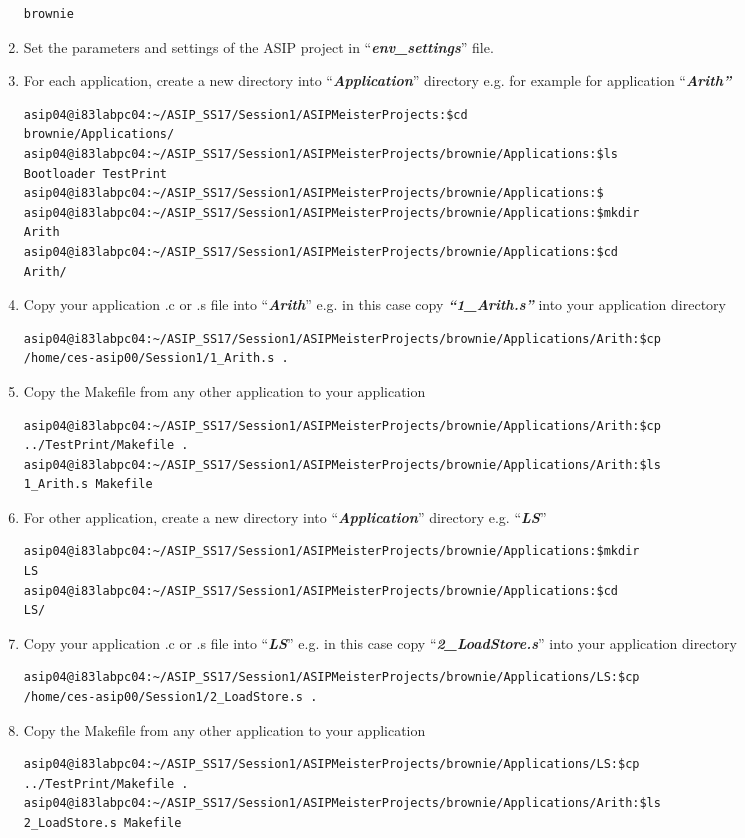 \begin{enumerate}
\begin{lstlisting}
brownie
\end{lstlisting}
	\item Set the parameters and settings of the ASIP project in 
	``\emph{\textbf{env\_settings}}'' file.
	\item For each application, create a new directory into
	``\emph{\textbf{Application}}'' directory e.g. for example for application ``\emph{\textbf{Arith''}}
\begin{lstlisting}
asip04@i83labpc04:~/ASIP_SS17/Session1/ASIPMeisterProjects:$cd
brownie/Applications/
asip04@i83labpc04:~/ASIP_SS17/Session1/ASIPMeisterProjects/brownie/Applications:$ls
Bootloader TestPrint
asip04@i83labpc04:~/ASIP_SS17/Session1/ASIPMeisterProjects/brownie/Applications:$
asip04@i83labpc04:~/ASIP_SS17/Session1/ASIPMeisterProjects/brownie/Applications:$mkdir
Arith
asip04@i83labpc04:~/ASIP_SS17/Session1/ASIPMeisterProjects/brownie/Applications:$cd
Arith/
\end{lstlisting}
	\item Copy your application .c or .s file into ``\emph{\textbf{Arith}}''
	e.g. in this case copy \emph{\textbf{``1\_Arith.s''}} into your
	application directory
\begin{lstlisting}
asip04@i83labpc04:~/ASIP_SS17/Session1/ASIPMeisterProjects/brownie/Applications/Arith:$cp
/home/ces-asip00/Session1/1_Arith.s .
\end{lstlisting}
	\item Copy the Makefile from any other application to your application
\begin{lstlisting}
asip04@i83labpc04:~/ASIP_SS17/Session1/ASIPMeisterProjects/brownie/Applications/Arith:$cp
../TestPrint/Makefile .
asip04@i83labpc04:~/ASIP_SS17/Session1/ASIPMeisterProjects/brownie/Applications/Arith:$ls
1_Arith.s Makefile
\end{lstlisting}
	\item For other application, create a new directory into
	``\emph{\textbf{Application}}'' directory e.g. ``\emph{\textbf{LS}}''
\begin{lstlisting}
asip04@i83labpc04:~/ASIP_SS17/Session1/ASIPMeisterProjects/brownie/Applications:$mkdir
LS
asip04@i83labpc04:~/ASIP_SS17/Session1/ASIPMeisterProjects/brownie/Applications:$cd
LS/
\end{lstlisting}
	\item Copy your application .c or .s file into ``\emph{\textbf{LS}}'' e.g.
	in this case copy ``\emph{\textbf{2\_LoadStore.s}}'' into your
	application directory
\begin{lstlisting}
asip04@i83labpc04:~/ASIP_SS17/Session1/ASIPMeisterProjects/brownie/Applications/LS:$cp
/home/ces-asip00/Session1/2_LoadStore.s .
\end{lstlisting}
	\item Copy the Makefile from any other application to your application
\begin{lstlisting}
asip04@i83labpc04:~/ASIP_SS17/Session1/ASIPMeisterProjects/brownie/Applications/LS:$cp
../TestPrint/Makefile .
asip04@i83labpc04:~/ASIP_SS17/Session1/ASIPMeisterProjects/brownie/Applications/Arith:$ls
2_LoadStore.s Makefile
\end{lstlisting}
\end{enumerate}
